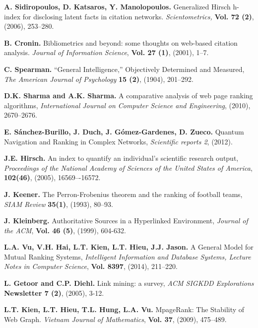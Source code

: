 \documentclass[10pt,leqno,twoside]{article}
\begin{document}
\vspace{-3ex}
\begin{thebibliography}{99}
\setlength{\parskip}{-3pt}\vspace{-2ex}

\textbf{A. Sidiropoulos, D. Katsaros, Y. Manolopoulos.}
Generalized Hirsch h-index for disclosing latent facts in citation networks.
\textit{Scientometrics,} \textbf{Vol. 72 (2)}, (2006), 253--280.

\textbf{B. Cronin.}
Bibliometrics and beyond: some thoughts on web-based citation analysis.
\textit{Journal of Information Science},
\textbf{Vol. 27 (1)}, (2001), 1--7.

\textbf{C. Spearman.}
``General Intelligence,'' Objectively Determined and Measured,
\textit{The American Journal of Psychology}
\textbf{ 15 (2)}, (1904), 201--292.

\textbf{D.K. Sharma and A.K. Sharma.}
A comparative analysis of web page ranking algorithms,
\textit{International Journal on Computer Science and Engineering}, (2010), 2670--2676.

\textbf{E. Sánchez-Burillo, J. Duch, J. Gómez-Gardenes, D. Zueco.}
Quantum Navigation and Ranking in Complex Networks,
\textit{Scientific reports 2}, (2012).

\textbf{J.E. Hirsch.}
An index to quantify an individual's scientific research output,
\textit{Proceedings of the National Academy of Sciences of the United States of America}, \textbf{102(46)}, (2005), 16569–-16572.


\textbf{J. Keener.}
The Perron-Frobenius theorem and the ranking of football teams,
\textit{SIAM Review} \textbf{ 35(1)}, (1993), 80--93.

\textbf{J. Kleinberg.}
Authoritative Sources in a Hyperlinked Environment,
\textit{Journal of the ACM}, \textbf{Vol. 46 (5)}, (1999), 604-632.

\textbf{L.A. Vu, V.H. Hai, L.T. Kien, L.T. Hieu, J.J. Jason.}
A General Model for Mutual Ranking Systems,
\textit{Intelligent Information and Database Systems, Lecture Notes in Computer Science},
\textbf{Vol. 8397}, (2014), 211--220.

\textbf{L. Getoor and C.P. Diehl.}
Link mining: a survey,
\textit{ACM SIGKDD Explorations}
\textbf{Newsletter 7 (2)}, (2005), 3-12.

\textbf{L.T. Kien, L.T. Hieu, T.L. Hung, L.A. Vu.}
MpageRank: The Stability of Web Graph.
\textit{Vietnam Journal of Mathematics}, \textbf{Vol. 37}, (2009), 475--489.


\end{thebibliography}
\end{document}
